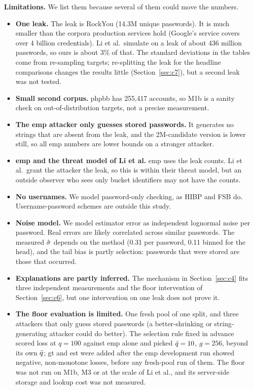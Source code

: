 \textbf{Limitations.} We list them because several of them could move the numbers.

\begin{itemize}
\item \textbf{One leak.} The leak is RockYou (14.3M unique passwords). It is much smaller than the corpora production services hold (Google's service covers over 4 billion credentials). Li et al.\ simulate on a leak of about 436 million passwords, so ours is about 3\% of that. The standard deviations in the tables come from re-sampling targets; re-splitting the leak for the headline comparisons changes the results little (Section~\ref{sec:c7}), but a second leak was not tested.
\item \textbf{Small second corpus.} phpbb has 255,417 accounts, so M1b is a sanity check on out-of-distribution targets, not a precise measurement.
\item \textbf{The emp attacker only guesses stored passwords.} It generates no strings that are absent from the leak, and the 2M-candidate version is lower still, so all emp numbers are lower bounds on a stronger attacker.
\item \textbf{emp and the threat model of Li et al.} emp uses the leak counts. Li et al.\ grant the attacker the leak, so this is within their threat model, but an outside observer who sees only bucket identifiers may not have the counts.
\item \textbf{No usernames.} We model password-only checking, as HIBP and FSB do. Username-password schemes are outside this study.
\item \textbf{Noise model.} We model estimator error as independent lognormal noise per password. Real errors are likely correlated across similar passwords. The measured $\hat\sigma$ depends on the method (0.31 per password, 0.11 binned for the head), and the tail bias is partly selection: passwords that were stored are those that occurred.
\item \textbf{Explanations are partly inferred.} The mechanism in Section~\ref{sec:c4} fits three independent measurements and the floor intervention of Section~\ref{sec:c6}, but one intervention on one leak does not prove it.
\item \textbf{The floor evaluation is limited.} One fresh pool of one split, and three attackers that only guess stored passwords (a better-shrinking or string-generating attacker could do better). The selection rule fixed in advance scored loss at $q=100$ against emp alone and picked $\bar q=10$, $g=256$, beyond its own $\bar q$; gt and est were added after the emp development run showed negative, non-monotone losses, before any fresh-pool run of them. The floor was not run on M1b, M3 or at the scale of Li et al., and its server-side storage and lookup cost was not measured.

\end{itemize}
